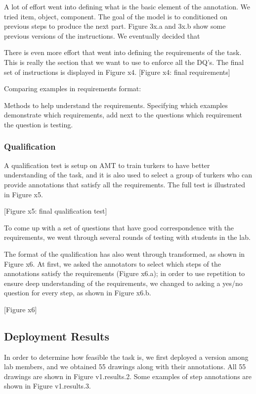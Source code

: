 A lot of effort went into defining what is the basic element of the annotation. We tried item, object, component. The goal of the model is to conditioned on previous steps to produce the next part. Figure 3x.a and 3x.b show some previous versions of the instructions. We eventually decided that  

There is even more effort that went into defining the requirements of the task. This is really the section that we want to use to enforce all the DQ's. The final set of instructions is displayed in Figure x4.
[Figure x4: final requirements]

Comparing examples in requirements format:

Methods to help understand the requirements. 
Specifying which examples demonstrate which requirements, add next to the questions which requirement the question is testing. 



\subsubsection{Qualification}

A qualification test is setup on AMT to train turkers to have better understanding of the task, and it is also used to select a group of turkers who can provide annotations that satisfy all the requirements. The full test is illustrated in Figure x5.

[Figure x5: final qualification test]

To come up with a set of questions that have good correspondence with the requirements, we went through several rounds of testing with students in the lab.  

The format of the qualification has also went through transformed, as shown in Figure x6. At first, we asked the annotators to select which steps of the annotations satisfy the requirements (Figure x6.a); in order to use repetition to ensure deep understanding of the requirements, we changed to asking a yes/no question for every step, as shown in Figure x6.b.  

[Figure x6]

\subsection{Deployment Results}

In order to determine how feasible the task is, we first deployed a version among lab members, and we obtained 55 drawings along with their annotations. All 55 drawings are shown in Figure v1.results.2. Some examples of step annotations are shown in Figure v1.results.3.  

